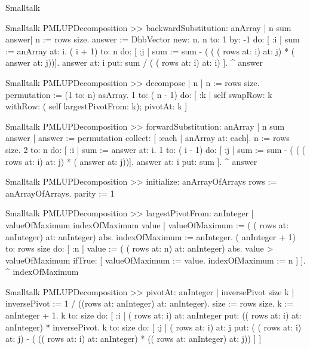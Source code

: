 \begin{displaycode}{Smalltalk}
\begin{displaycode}{Smalltalk}
PMLUPDecomposition >> backwardSubstitution: anArray
    | n sum answer|
    n := rows size.
    answer := DhbVector new: n.
    n to: 1 by: -1 do:
        [ :i |
          sum := anArray at: i.
          ( i + 1) to: n do: [ :j | sum := sum - ( ( ( rows at: i) 
                                           at: j) * ( answer at: j))].
          answer at: i put: sum / ( ( rows at: i) at: i) ].
    ^ answer
\end{displaycode}

\begin{displaycode}{Smalltalk}
PMLUPDecomposition >> decompose
    | n |
    n := rows size.
    permutation := (1 to: n) asArray.
    1 to: ( n - 1) do:
        [ :k |
          self swapRow: k withRow: ( self largestPivotFrom: k);
               pivotAt: k ]
\end{displaycode}

\begin{displaycode}{Smalltalk}
PMLUPDecomposition >> forwardSubstitution: anArray
    | n sum answer |
    answer := permutation collect: [ :each | anArray at: each].
    n := rows size.
    2 to: n do:
        [ :i |
          sum := answer at: i.
          1 to: ( i - 1) do: [ :j | sum := sum - ( ( ( rows at: i) 
                                           at: j) * ( answer at: j))].
          answer at: i put: sum ].
    ^ answer
\end{displaycode}

\begin{displaycode}{Smalltalk}
PMLUPDecomposition >> initialize: anArrayOfArrays
    rows := anArrayOfArrays.
    parity := 1
\end{displaycode}

\begin{displaycode}{Smalltalk}
PMLUPDecomposition >> largestPivotFrom: anInteger
    | valueOfMaximum indexOfMaximum value |
    valueOfMaximum := ( ( rows at: anInteger) at: anInteger) abs.
    indexOfMaximum := anInteger.
    ( anInteger + 1) to: rows size do:
        [ :n |
          value := ( ( rows at: n) at: anInteger) abs.
          value > valueOfMaximum
                ifTrue: [ valueOfMaximum := value.
                          indexOfMaximum := n ] ].
    ^ indexOfMaximum 
\end{displaycode}

\begin{displaycode}{Smalltalk}
PMLUPDecomposition >> pivotAt: anInteger
    | inversePivot size k |
    inversePivot := 1 / ((rows at: anInteger) at: anInteger).
    size := rows size.
    k := anInteger + 1.
    k to: size
        do: [ :i |
              ( rows at: i) at: anInteger put: (( rows at: i) at: 
                                            anInteger) * inversePivot.
              k to: size
                do: [ :j |
                      ( rows at: i) at: j put: ( ( rows at: i) at: j) 
   - ( (( rows at: i) at: anInteger) * (( rows at: anInteger) at: j)) ]
            ]
\end{displaycode}


\end{displaycode}
